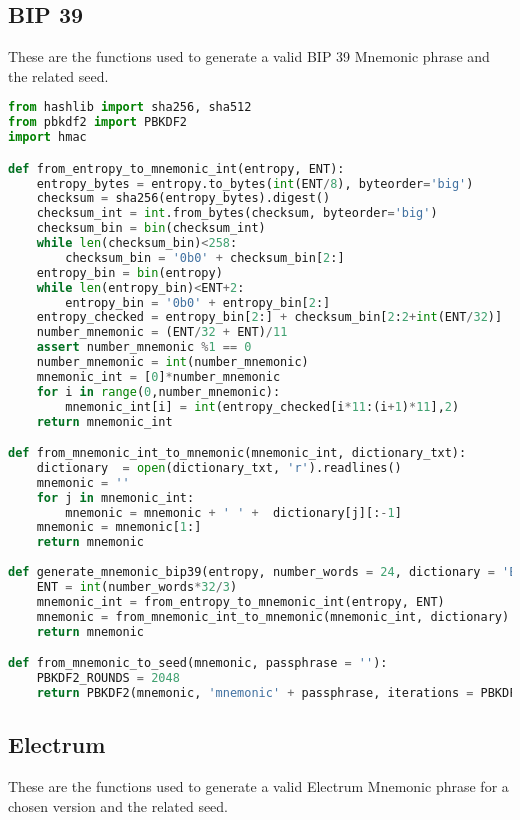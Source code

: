 \subsection{BIP 39}
\begin{flushleft}
	These are the functions used to generate a valid BIP 39 Mnemonic phrase and the related seed.
\end{flushleft}

\begin{lstlisting}[language=Python]
from hashlib import sha256, sha512
from pbkdf2 import PBKDF2
import hmac

def from_entropy_to_mnemonic_int(entropy, ENT):  
	entropy_bytes = entropy.to_bytes(int(ENT/8), byteorder='big')
	checksum = sha256(entropy_bytes).digest()
	checksum_int = int.from_bytes(checksum, byteorder='big')
	checksum_bin = bin(checksum_int)
	while len(checksum_bin)<258:
		checksum_bin = '0b0' + checksum_bin[2:]
	entropy_bin = bin(entropy)
	while len(entropy_bin)<ENT+2:
		entropy_bin = '0b0' + entropy_bin[2:]
	entropy_checked = entropy_bin[2:] + checksum_bin[2:2+int(ENT/32)]
	number_mnemonic = (ENT/32 + ENT)/11
	assert number_mnemonic %1 == 0
	number_mnemonic = int(number_mnemonic)
	mnemonic_int = [0]*number_mnemonic
	for i in range(0,number_mnemonic):
		mnemonic_int[i] = int(entropy_checked[i*11:(i+1)*11],2)
	return mnemonic_int

def from_mnemonic_int_to_mnemonic(mnemonic_int, dictionary_txt):
	dictionary  = open(dictionary_txt, 'r').readlines()
	mnemonic = ''
	for j in mnemonic_int:
		mnemonic = mnemonic + ' ' +  dictionary[j][:-1]
	mnemonic = mnemonic[1:]
	return mnemonic
	
def generate_mnemonic_bip39(entropy, number_words = 24, dictionary = 'English_dictionary.txt'):
	ENT = int(number_words*32/3)
	mnemonic_int = from_entropy_to_mnemonic_int(entropy, ENT)
	mnemonic = from_mnemonic_int_to_mnemonic(mnemonic_int, dictionary)
	return mnemonic

def from_mnemonic_to_seed(mnemonic, passphrase = ''):
	PBKDF2_ROUNDS = 2048
	return PBKDF2(mnemonic, 'mnemonic' + passphrase, iterations = PBKDF2_ROUNDS, macmodule = hmac, digestmodule = sha512).read(64).hex())
\end{lstlisting}


\subsection{Electrum}

\begin{flushleft}
	These are the functions used to generate a valid Electrum Mnemonic phrase for a chosen version and the related seed.
\end{flushleft}

